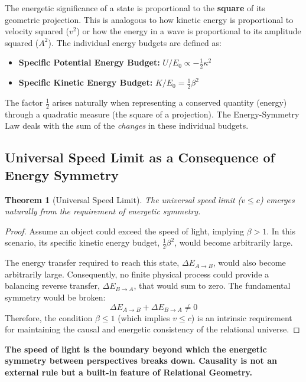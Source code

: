 \documentclass[12pt, a4paper]{article}
\newtheorem{theorem}{Theorem}[section]
\begin{document}
The energetic significance of a state is proportional to the \textbf{square} of its geometric projection. This is analogous to how kinetic energy is proportional to velocity squared ($v^2$) or how the energy in a wave is proportional to its amplitude squared ($A^2$). The individual energy budgets are defined as:
\begin{itemize}
    \item \textbf{Specific Potential Energy Budget:} $U/E_0 \propto -\frac{1}{2}\kappa^2$
    \item \textbf{Specific Kinetic Energy Budget:} $K/E_0 = \frac{1}{2}\beta^2$
\end{itemize}
The factor $\frac{1}{2}$ arises naturally when representing a conserved quantity (energy) through a quadratic measure (the square of a projection). The Energy-Symmetry Law deals with the sum of the \textit{changes} in these individual budgets.

\subsection{Universal Speed Limit as a Consequence of Energy Symmetry}
\begin{theorem}[Universal Speed Limit]
The universal speed limit ($v \leq c$) emerges naturally from the requirement of energetic symmetry.
\end{theorem}
\begin{proof}
Assume an object could exceed the speed of light, implying $\beta > 1$. In this scenario, its specific kinetic energy budget, $\frac{1}{2}\beta^2$, would become arbitrarily large.

The energy transfer required to reach this state, $\Delta E_{A \to B}$, would also become arbitrarily large. Consequently, no finite physical process could provide a balancing reverse transfer, $\Delta E_{B \to A}$, that would sum to zero. The fundamental symmetry would be broken:
\begin{equation}
\Delta E_{A \to B} + \Delta E_{B \to A} \neq 0
\end{equation}
Therefore, the condition $\beta \leq 1$ (which implies $v \leq c$) is an intrinsic requirement for maintaining the causal and energetic consistency of the relational universe.
\end{proof}

\begin{tcolorbox}[colback=gray!5, colframe=black!80!black, title=Summary]
\textbf{The speed of light is the boundary beyond which the energetic symmetry between perspectives breaks down. Causality is not an external rule but a built-in feature of Relational Geometry.}
\end{tcolorbox}
\end{document}
